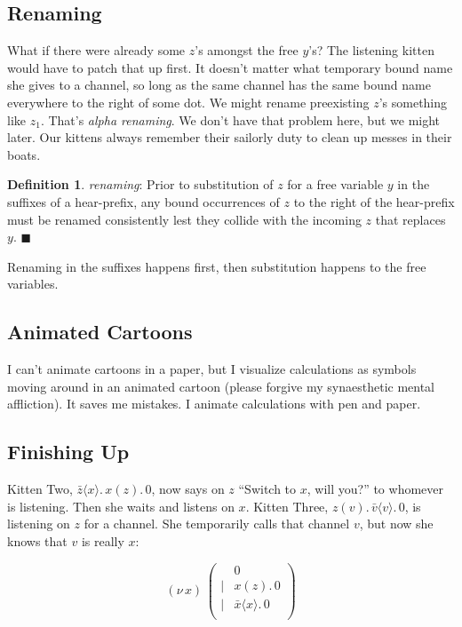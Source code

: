 \documentclass[10pt,oneside,x11names]{article}
\newcommand\napping    [0]{0}
\newcommand\chatting   [3]{\bar{#1}\langle{#2}\rangle{}.\,#3}
\newcommand\listening  [3]{#1(#2).\,#3}
\newcommand\whispering [2]{(\nu\,#1)\,{#2}}
\newcommand{\kitThree}{\listening{z}{v}{\chatting{v}{v}{\napping}}}
\theoremstyle{definition}
\newtheorem{definition}{Definition}
\theoremstyle{warning}
\begin{document}
\subsection{Renaming}
\label{sec:org01ac95a}

What if there were already some \(z\)'s amongst the free \(y\)'s? The
listening kitten would have to patch that up first. It doesn't
matter what temporary bound name she gives to a channel, so long
as the same channel has the same bound name everywhere to the
right of some dot. We might rename preexisting \(z\)'s something
like \(z_1\). That's \emph{alpha renaming}. We don't have that problem
here, but we might later. Our kittens always remember their
sailorly duty to clean up messes in their boats.

\label{def:renaming}
\begin{definition}{\emph{renaming}:}
  Prior to substitution of $z$ for a free variable $y$ in the suffixes of
  a hear-prefix,
  any bound occurrences of $z$ to the right of the hear-prefix must be
  renamed consistently lest they collide with the incoming $z$
  that replaces $y$. $\blacksquare$
\end{definition}

Renaming in the suffixes happens first, then substitution happens
to the free variables.

\subsection{Animated Cartoons}
\label{sec:org6a9f4cc}

I can't animate cartoons in a paper, but I visualize calculations
as symbols moving around in an animated cartoon (please forgive my
synaesthetic mental affliction). It saves me mistakes. I animate
calculations with pen and paper.

\subsection{Finishing Up}
\label{sec:orgeede3fd}

Kitten Two, \(\chatting{z}{x}{\listening{x}{z}{\napping}}\), now
says on \(z\) ``Switch to \(x\), will you?'' to whomever is listening.
Then she waits and listens on \(x\). Kitten Three, \(\kitThree\), is
listening on \(z\) for a channel.  She temporarily calls that channel
\(v\), but now she knows that \(v\) is really \(x\):

\begin{equation}
\whispering{x}{\left(
\begin{array}{clll}
 {}     & \napping  \\
 \vert  & {\listening{x}{z}{\napping}} \\
 \vert  & {\chatting{x}{x}{\napping}} \\
\end{array}\right)}
\end{equation}
\end{document}

